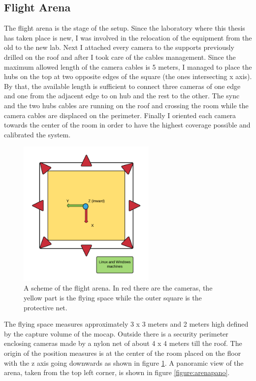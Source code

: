 \subsection{Flight Arena}
The flight arena is the stage of the setup. Since the laboratory where this thesis has taken place is new, I was involved in the relocation of the equipment from the old to the new lab. Next I attached every camera to the supports previously drilled on the roof and after I took care of the cables management. Since the maximum allowed length of the camera cables is 5 meters, I managed to place the hubs on the top at two opposite edges of the square (the ones intersecting x axis). By that, the available length is sufficient to connect three cameras of one edge and one from the adjacent edge to on hub and the rest to the other. The sync and the two hubs cables are running on the roof and crossing the room while the camera cables are displaced on the perimeter. Finally I oriented each camera towards the center of the room in order to have the highest coverage possible and calibrated the system.
\begin{figure}[h]
\centering
 \includegraphics[width=0.6\textwidth]{flight_arena.png}
 \caption[Flight arena]{A scheme of the flight arena. In red there are the cameras, the yellow part is the flying space while the outer square is the protective net.}
 \label{figure:arena}
\end{figure}
\noindent
The flying space measures approximately 3 x 3 meters and 2 meters high defined by the capture volume of the mocap. Outside there is a security perimeter enclosing cameras made by a nylon net of about 4 x 4 meters till the roof. The origin of the position measures is at the center of the room placed on the floor with the z axis going downwards as shown in figure \ref{figure:arena}. A panoramic view of the arena, taken from the top left corner, is shown in figure \ref{figure:arenapano}. 


